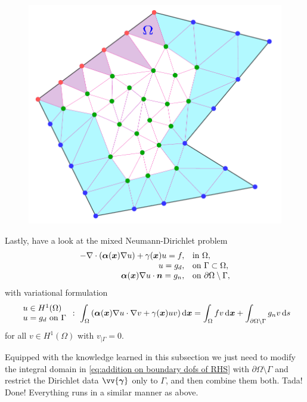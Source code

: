 	\begingroup
	\setlength{\intextsep}{0pt}%
	\setlength{\columnsep}{0pt}%
	\begin{figure}
		\includegraphics[width=1\linewidth]{svg/mixed_BCs}\vspace{-20pt}
	\end{figure}
	Lastly, have a look at the mixed Neumann-Dirichlet problem
	\begin{equation}
		\begin{array}{rl}
			-\nabla\cdot(\bm{\alpha}(\bm{x}) \nabla u)+
			\gamma(\bm{x})u=f,  &\textrm{in }\Omega,\\
			u=g_d,  &\textrm{on }\Gamma\subset\Omega,\\
			\bm{\alpha}(\bm{x})\nabla{u}\cdot\bm{n}=g_n,
			&\textrm{on }\partial\Omega\setminus\Gamma,
		\end{array}
	\end{equation}
	with variational formulation
	\begin{equation}
		\begin{array}{l}			
			u\in H^1(\Omega)\\
			u=g_d \textrm{ on }\Gamma
		\end{array}:\ 
		\int_{\Omega}\left(\bm{\alpha}(\bx)\nabla u\cdot\nabla v+
		\gamma(\bx)uv\right)\dx = \int_{\Omega}fv\,\dx+
		\int_{\partial\Omega\setminus\Gamma} g_n v\,\rd s
	\end{equation}
	for all $v\in H^1(\Omega)$ with $v_{|\Gamma}=0$.
	\endgroup
		
	Equipped with the knowledge learned in this subsection we just need to 
	modify the integral domain in \eqref{eq:addition on boundary dofs of RHS} 
	with $\partial\Omega\setminus\Gamma$ and restrict the Dirichlet data 
	$\vv{\bm{\gamma}}$ only to $\Gamma$, and then combine them both. Tada!
	Done! Everything runs in a similar manner as above.
	
